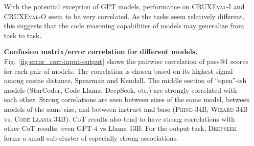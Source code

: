 \documentclass{article}
\newcommand{\benchmarki}{\textsc{CRUXEval-I}\xspace}
\newcommand{\benchmarko}{\textsc{CRUXEval-O}\xspace}
\newcommand{\codellamalarge}{\textsc{Code Llama 34B}\xspace}
\begin{document}
\begin{tcolorbox}[colback=lightgreen, boxrule=0pt, arc=10pt, outer arc=10pt]
With the potential exception of GPT models, performance on \benchmarki and \benchmarko seem to be very correlated. As the tasks seem relatively different, this suggests that the code reasoning capabilities of models may generalize from task to task.
\end{tcolorbox}


\textbf{Confusion matrix/error correlation for different models.}
Fig.~\ref{fig:error_corr-input-output} shows the pairwise correlation of pass@1 scores for each pair of models. The correlation is chosen based on its highest signal among cosine distance, Spearman and Kendall. The middle section of ``open''-ish models (StarCoder, Code Llama, DeepSeek, etc.) are strongly correlated with each other. Strong correlations are seen between sizes of the same model, between models of the same size, and between instruct and base (\textsc{Phind 34B, Wizard 34B} vs. \codellamalarge). CoT results also tend to have strong correlations with other CoT results, even GPT-4 vs Llama 13B. For the output task, \textsc{Deepseek} forms a small sub-cluster of especially strong associations.
\end{document}
